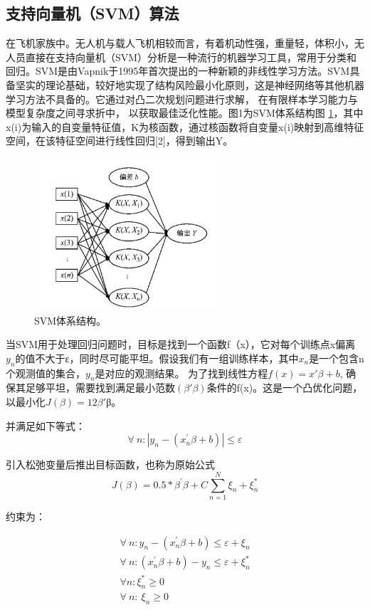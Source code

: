 \subsection{支持向量机（SVM）算法}
在飞机家族中。无人机与载人飞机相较而言，有着机动性强，重量轻，体积小，无人员直接在支持向量机（SVM）分析是一种流行的机器学习工具，常用于分类和回归。SVM是由Vapnik于1995年首次提出的一种新颖的非线性学习方法。SVM具备坚实的理论基础，较好地实现了结构风险最小化原则，这是神经网络等其他机器学习方法不具备的。它通过对凸二次规划问题进行求解， 在有限样本学习能力与模型复杂度之间寻求折中， 以获取最佳泛化性能。图1为SVM体系结构图 \ref{fig:SVM}，其中x(i)为输入的自变量特征值，K为核函数，通过核函数将自变量x(i)映射到高维特征空间，在该特征空间进行线性回归[2]，得到输出Y。
\begin{figure}[!htbp]
    \centering
    \includegraphics[width=7cm]{pic/svm.png}%
    \caption{SVM体系结构。}
    \label{fig:SVM}
\end{figure}

当SVM用于处理回归问题时，目标是找到一个函数f（x），它对每个训练点x偏离$y_n$的值不大于ε，同时尽可能平坦。假设我们有一组训练样本，其中$x_n$是一个包含n个观测值的集合，$y_n$是对应的观测结果。
为了找到线性方程$f(x)=x′β+b$, 确保其足够平坦，需要找到满足最小范数$(β′β)$条件的f(x)。这是一个凸优化问题，以最小化$J(β)=12β′$β。

并满足如下等式：
\begin{equation}
\forall\ n:\left|y_n-\left(x_n^\prime\beta+b\right)\right|\le\varepsilon
\end{equation}

引入松弛变量后推出目标函数，也称为原始公式
\begin{equation}
J\left(\beta\right)=0.5\ast\beta^\prime\beta+C\sum_{n=1}^{N}{\xi_n+\xi_n^\ast}
\end{equation}

约束为：

\begin{equation}
\begin{gathered}
\forall\ n:y_n-\left(x_n^\prime\beta+b\right)\le\varepsilon+\xi_n\\
\forall\ n:\left(x_n^\prime\beta+b\right)-y_n\le\varepsilon+\xi_n^\ast\\
{\forall n:\xi}_n^\ast\geq0\\
\forall\ n:\ \xi_n\geq0
\end{gathered}
\end{equation}

